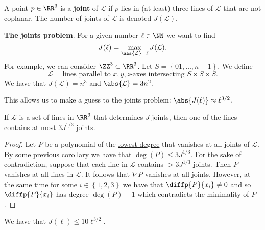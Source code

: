 \documentclass[12pt, a4paper]{article}
\begin{document}
\begin{definition}
    A point \(p \in \RR^{3}\) is a \textbf{joint} of \(\mathcal{L}\) if \(p\) lies in (at least) three lines of \(\mathcal{L}\) that are not coplanar. The number of joints of \(\mathcal{L}\) is denoted \(J(\mathcal{L})\).
\end{definition}

\begin{mdexample}
    \textbf{The joints problem}. For a given number \(\ell\in \NN\) we want to find 
    \[J(\ell)=\max_{\abs{\mathcal{L}}=\ell} J(\mathcal{L}).\]
    For example, we can consider \(\ZZ^3 \subset \RR^3\). Let \(S =\left\{ 01,\ldots,n-1 \right\}\). We define 
    \[\mathcal{L} = \text{lines parallel to \(x,y,z\)-axes intersecting \(S \times S \times S\)}.\]
    We have that \(J(\mathcal{L}) = n^3\) and \(\abs{\mathcal{L}}=3n^2\).
\end{mdexample}

\begin{mdnote}
    This allows us to make a guess to the joints problem: \(\abs{J(\ell)} \approx \ell^{3/2}\).
\end{mdnote}

\begin{lemma}
    If \(\mathcal{L}\) is a set of lines in \(\RR^3\) that determines \(J\) joints, then one of the lines contains at most \(3J^{1/3}\) joints.
\end{lemma}

\begin{proof}
    Let \(P\) be a polynomial of the \ul{lowest degree} that vanishes at all joints of \(\mathcal{L}\). By some previous corollary we have that \(\deg(P) \leq 3J^{1/3}\). For the sake of contradiction, suppose that each line in \(\mathcal{L}\) contains \(> 3J^{1/3}\) joints. Then \(P\) vanishes at all lines in \(\mathcal{L}\). It follows that \(\nabla P\) vanishes at all joints. However, at the same time for some \(i \in \left\{ 1,2,3 \right\}\) we have that \(\diffp{P}{{x_i}} \neq 0\) and so \(\diffp{P}{{x_i}}\) has degree \(\deg(P)-1\) which contradicts the minimality of \(P\).
\end{proof}

\begin{mdthm}
    We have that \(J(\ell) \leq 10 \ell^{3/2}\).
\end{mdthm}
\end{document}
